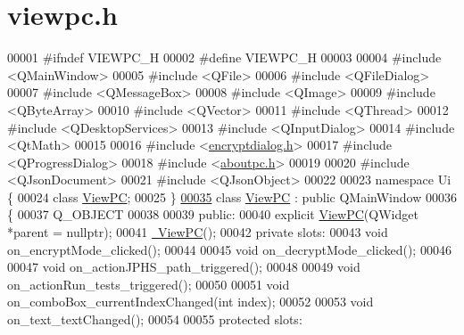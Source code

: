 \hypertarget{viewpc_8h_source}{\section{viewpc.\-h}
}

\begin{DoxyCode}
00001 \textcolor{preprocessor}{#ifndef VIEWPC\_H}
00002 \textcolor{preprocessor}{}\textcolor{preprocessor}{#define VIEWPC\_H}
00003 \textcolor{preprocessor}{}
00004 \textcolor{preprocessor}{#include <QMainWindow>}
00005 \textcolor{preprocessor}{#include <QFile>}
00006 \textcolor{preprocessor}{#include <QFileDialog>}
00007 \textcolor{preprocessor}{#include <QMessageBox>}
00008 \textcolor{preprocessor}{#include <QImage>}
00009 \textcolor{preprocessor}{#include <QByteArray>}
00010 \textcolor{preprocessor}{#include <QVector>}
00011 \textcolor{preprocessor}{#include <QThread>}
00012 \textcolor{preprocessor}{#include <QDesktopServices>}
00013 \textcolor{preprocessor}{#include <QInputDialog>}
00014 \textcolor{preprocessor}{#include <QtMath>}
00015 
00016 \textcolor{preprocessor}{#include <\hyperlink{encryptdialog_8h}{encryptdialog.h}>}
00017 \textcolor{preprocessor}{#include <QProgressDialog>}
00018 \textcolor{preprocessor}{#include <\hyperlink{aboutpc_8h}{aboutpc.h}>}
00019 
00020 \textcolor{preprocessor}{#include <QJsonDocument>}
00021 \textcolor{preprocessor}{#include <QJsonObject>}
00022 
00023 \textcolor{keyword}{namespace }Ui \{
00024 \textcolor{keyword}{class }\hyperlink{class_view_p_c}{ViewPC};
00025 \}
\hypertarget{viewpc_8h_source_l00035}{}\hyperlink{class_view_p_c}{00035} \textcolor{keyword}{class }\hyperlink{class_view_p_c}{ViewPC} : \textcolor{keyword}{public} QMainWindow
00036 \{
00037     Q\_OBJECT
00038 
00039 \textcolor{keyword}{public}:
00040     \textcolor{keyword}{explicit} \hyperlink{class_view_p_c_a33c96c61f61042319c66c19059836b7f}{ViewPC}(QWidget *parent = \textcolor{keyword}{nullptr});
00041     \hyperlink{class_view_p_c_a91c51f5c1e6ed5ab12b410339f469b0f}{~ViewPC}();
00042 \textcolor{keyword}{private} slots:
00043     \textcolor{keywordtype}{void} on\_encryptMode\_clicked();
00044 
00045     \textcolor{keywordtype}{void} on\_decryptMode\_clicked();
00046 
00047     \textcolor{keywordtype}{void} on\_actionJPHS\_path\_triggered();
00048 
00049     \textcolor{keywordtype}{void} on\_actionRun\_tests\_triggered();
00050 
00051     \textcolor{keywordtype}{void} on\_comboBox\_currentIndexChanged(\textcolor{keywordtype}{int} index);
00052 
00053     \textcolor{keywordtype}{void} on\_text\_textChanged();
00054 
00055 \textcolor{keyword}{protected} slots:

\end{DoxyCode}
